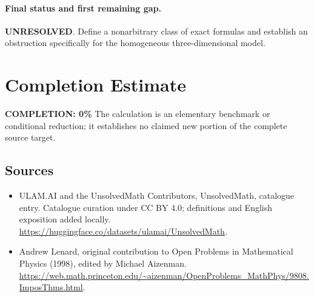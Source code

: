\documentclass[11pt]{article}
\begin{document}
\paragraph{Final status and first remaining gap.}
\textbf{UNRESOLVED}. Define a nonarbitrary class of exact formulas and establish an obstruction specifically for the homogeneous three-dimensional model.

\section{Completion Estimate}
\noindent\textbf{COMPLETION: 0\%}
The calculation is an elementary benchmark or conditional reduction; it establishes no claimed new portion of the complete source target.

\subsection{Sources}
\begin{itemize}
\item[\hypertarget{source:statement:1}{S1}] ULAM.AI and the UnsolvedMath Contributors, UnsolvedMath, catalogue entry. Catalogue curation under CC BY 4.0; definitions and English exposition added locally.
\url{https://huggingface.co/datasets/ulamai/UnsolvedMath}.
\item[\hypertarget{source:statement:2}{S2}] Andrew Lenard, original contribution to Open Problems in Mathematical Physics (1998), edited by Michael Aizenman.
\url{https://web.math.princeton.edu/~aizenman/OpenProblems_MathPhys/9808.ImposThms.html}.
\end{itemize}
\label{end:statement}
\end{document}
